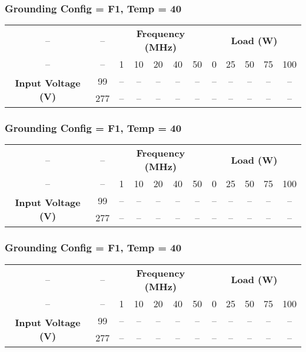 \vspace{1em}

\subsubsection{Grounding Config = F1, Temp = 40}

\begin{center}
\begin{tabular}{cccccccccccc}
-- & -- & \multicolumn{5}{c}{\textbf{Frequency (MHz)}} & \multicolumn{5}{c}{\textbf{Load (W)}} \\
-- & -- & 1 & 10 & 20 & 40 & 50 & 0 & 25 & 50 & 75 & 100 \\
\midrule
\multirow{2}{*}{\textbf{Input Voltage (V)}} & 99 & -- & -- & -- & -- & -- & -- & -- & -- & -- & -- \\
 & 277 & -- & -- & -- & -- & -- & -- & -- & -- & -- & -- \\
\end{tabular}
\end{center}

\vspace{1em}

\subsubsection{Grounding Config = F1, Temp = 40}

\begin{center}
\begin{tabular}{cccccccccccc}
-- & -- & \multicolumn{5}{c}{\textbf{Frequency (MHz)}} & \multicolumn{5}{c}{\textbf{Load (W)}} \\
-- & -- & 1 & 10 & 20 & 40 & 50 & 0 & 25 & 50 & 75 & 100 \\
\midrule
\multirow{2}{*}{\textbf{Input Voltage (V)}} & 99 & -- & -- & -- & -- & -- & -- & -- & -- & -- & -- \\
 & 277 & -- & -- & -- & -- & -- & -- & -- & -- & -- & -- \\
\end{tabular}
\end{center}

\vspace{1em}

\subsubsection{Grounding Config = F1, Temp = 40}

\begin{center}
\begin{tabular}{cccccccccccc}
-- & -- & \multicolumn{5}{c}{\textbf{Frequency (MHz)}} & \multicolumn{5}{c}{\textbf{Load (W)}} \\
-- & -- & 1 & 10 & 20 & 40 & 50 & 0 & 25 & 50 & 75 & 100 \\
\midrule
\multirow{2}{*}{\textbf{Input Voltage (V)}} & 99 & -- & -- & -- & -- & -- & -- & -- & -- & -- & -- \\
 & 277 & -- & -- & -- & -- & -- & -- & -- & -- & -- & -- \\
\end{tabular}
\end{center}

